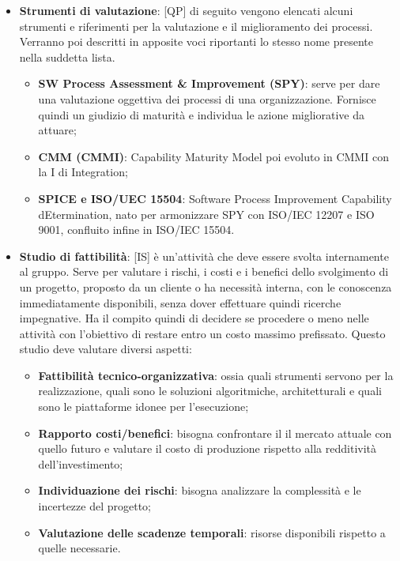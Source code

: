 \begin{itemize}
\begin{itemize}
		\end{itemize}
	\item \textbf{Strumenti di valutazione}: [QP] di seguito vengono elencati alcuni strumenti e riferimenti per la valutazione e il miglioramento dei processi. Verranno poi descritti in apposite voci riportanti lo stesso nome presente nella suddetta lista.
		\begin{itemize}
			\item \textbf{SW Process Assessment \& Improvement (SPY)}: serve per dare una valutazione oggettiva dei processi di una organizzazione. Fornisce quindi un giudizio di maturità e individua le azione migliorative da attuare;
			\item \textbf{CMM (CMMI)}: Capability Maturity Model poi evoluto in CMMI con la I di Integration;
			\item \textbf{SPICE e ISO/UEC 15504}: Software Process Improvement Capability dEtermination, nato per armonizzare SPY con ISO/IEC 12207 e ISO 9001, confluito infine in ISO/IEC 15504.
		\end{itemize}
	\item \textbf{Studio di fattibilità}: [IS] è un'attività che deve essere svolta internamente al gruppo. Serve per valutare i rischi, i costi e i benefici dello svolgimento di un progetto, proposto da un cliente o ha necessità interna, con le conoscenza immediatamente disponibili, senza dover effettuare quindi ricerche impegnative. Ha il compito quindi di decidere se procedere o meno nelle attività con l'obiettivo di restare entro un costo massimo prefissato. \newline
	Questo studio deve valutare diversi aspetti:
		\begin{itemize}
			\item \textbf{Fattibilità tecnico-organizzativa}: ossia quali strumenti servono per la realizzazione, quali sono le soluzioni algoritmiche, architetturali e quali sono le piattaforme idonee per l'esecuzione;
			\item \textbf{Rapporto costi/benefici}: bisogna confrontare il il mercato attuale con quello futuro e valutare il costo di produzione rispetto alla redditività dell'investimento;
			\item \textbf{Individuazione dei rischi}: bisogna analizzare la complessità e le incertezze del progetto;
			\item \textbf{Valutazione delle scadenze temporali}: risorse disponibili rispetto a quelle necessarie.
		\end{itemize}
\end{itemize}